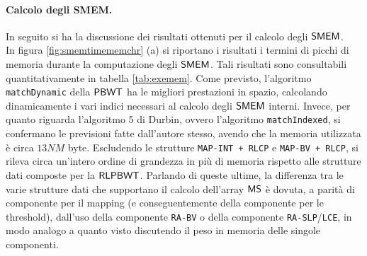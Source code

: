 \paragraph{Calcolo degli SMEM.}
In seguito si ha la discussione dei risultati ottenuti per il calcolo degli
$\mbox{\rm {\sf SMEM}}$.\\ 
In figura \ref{fig:smemtimememchr} (a) si riportano i risultati i termini di
picchi di 
memoria durante la computazione degli $\mbox{\rm {\sf SMEM}}$. Tali risultati sono
consultabili quantitativamente in tabella \ref{tab:exemem}. Come previsto,
l'algoritmo 
\texttt{matchDynamic} della $\mbox{\rm {\sf PBWT}}$ ha le migliori prestazioni
in spazio, calcolando dinamicamente i vari indici necessari al calcolo degli
$\mbox{\rm {\sf SMEM}}$ interni. Invece, per quanto riguarda l'algoritmo
5 di Durbin, ovvero l'algoritmo \texttt{matchIndexed}, si confermano le
previsioni 
fatte dall'autore stesso, avendo che la memoria utilizzata è circa $13NM$
byte. Escludendo le strutture \texttt{MAP-INT + RLCP} e \texttt{MAP-BV + RLCP},
si rileva circa un'intero ordine di grandezza in più di memoria rispetto alle
strutture dati composte per la $\mbox{\rm {\sf RLPBWT}}$. Parlando di queste ultime, la
differenza tra le varie strutture dati che supportano il calcolo 
dell'array $\mbox{\rm {\sf MS}}$ è dovuta, a parità di componente per il mapping (e
conseguentemente della componente per le threshold), dall'uso della componente
\texttt{RA-BV} o della componente \texttt{RA-SLP}/\texttt{LCE},
in modo analogo a quanto visto discutendo il peso in memoria
delle singole componenti.\\
